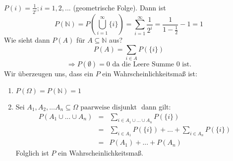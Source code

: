 \paragraph*{}
\label{Zu 1}
$P({i}) = \frac{1}{2^i}; i = 1,2,... $ (geometrische Folge). Dann ist
$$P(\mathbb N) = P \left ( \bigcup_{i=1}^\infty \{i\} \right ) = \sum_{i=1}^\infty \frac{1}{2^i} %
= \frac{1}{1-\frac{1}{2}} - 1 = 1$$ 
Wie sieht dann $P(A)$ für $A \subseteq \mathbb N$ aus?
$$P(A) = \sum_{i \in A} P(\{i\})$$
$$ \Rightarrow P(\emptyset) = 0 \textrm{ da die Leere Summe 0 ist.}$$
Wir überzeugen uns, dass ein $P$ ein Wahrscheinlichkeitsmaß ist:
\begin{enumerate}
 \item $ P(\Omega) = P(\mathbb N) = 1 $
 \item Sei $ A_1, A_2, ... A_n \subseteq \Omega \textrm{ paarweise disjunkt } $ dann gilt:
\begin{eqnarray}
 P(A_1 \cup ... \cup A_n) & = & \sum_{i \in A_1 \cup ... \cup A_n} P(\{i\}) \nonumber \\
 & = & \sum_{i \in A_1} P(\{i\}) + ... + \sum_{i \in A_n} P(\{i\}) \nonumber \\
 & = & P(A_1) + ... + P(A_n) \nonumber
\end{eqnarray}
Folglich ist $P$ ein Wahrscheinlichkeitsmaß.
\end{enumerate}
